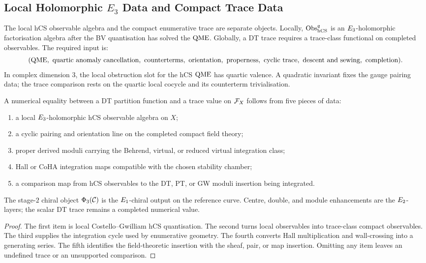 \subsection*{Local Holomorphic \texorpdfstring{$E_3$}{E3} Data and
Compact Trace Data}
\label{subsec:local-e3-compact-trace-data}

The local hCS observable algebra and the compact enumerative trace are
separate objects.  Locally, \(\mathrm{Obs}^q_{\mathrm{hCS}}\) is an
\(E_3\)-holomorphic factorisation algebra after the BV
quantisation has solved the \(\mathrm{QME}\).  Globally, a DT trace requires a
trace-class functional on completed observables.  The required input is:
\[
  (\mathrm{QME},\ \text{quartic anomaly cancellation},\
  \text{counterterms},\ \text{orientation},\
  \text{properness},\ \text{cyclic trace},\
  \text{descent and sewing},\ \text{completion}).
\]
In complex dimension \(3\), the local obstruction slot for the hCS
\(\mathrm{QME}\) has quartic valence.  A quadratic invariant fixes the gauge
pairing data; the trace comparison rests on the quartic local cocycle
and its counterterm trivialisation.

\begin{proposition}[Five inputs for a DT trace]
\label{wn:prop:five-inputs-dt-trace}
A numerical equality between a DT partition function and a trace value
on \(\mathcal{F}_X\) follows from five pieces of data:
\begin{enumerate}
\item a local \(E_3\)-holomorphic hCS observable algebra on \(X\);
\item a cyclic pairing and orientation line on the completed compact
field theory;
\item proper derived moduli carrying the Behrend, virtual, or reduced
virtual integration class;
\item Hall or CoHA integration maps compatible with the chosen
stability chamber;
\item a comparison map from hCS observables to the DT, PT, or GW
moduli insertion being integrated.
\end{enumerate}
The stage-\(2\) chiral object \(\Phi_3(\mathcal{C})\) is the
\(E_1\)-chiral output on the reference curve.  Centre, double, and
module enhancements are the \(E_2\)-layers; the scalar DT trace
remains a completed numerical value.
\end{proposition}

\begin{proof}
The first item is local Costello--Gwilliam hCS quantisation.  The
second turns local observables into trace-class compact observables.
The third supplies the integration cycle used by enumerative geometry.
The fourth converts Hall multiplication and wall-crossing into a
generating series.  The fifth identifies the field-theoretic insertion
with the sheaf, pair, or map insertion.  Omitting any item leaves an
undefined trace or an unsupported comparison.
\end{proof}

